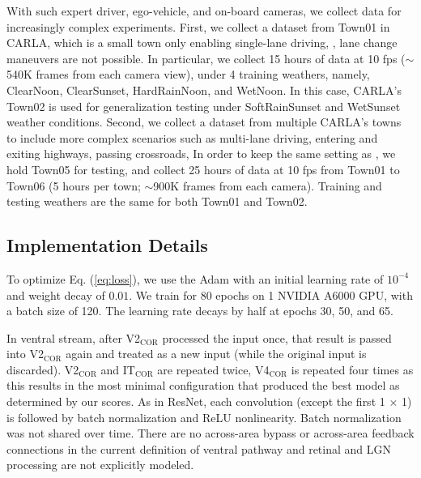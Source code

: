 With such expert driver, ego-vehicle, and on-board cameras, we collect data for increasingly complex experiments. 
First, we collect a dataset from Town01 in CARLA, which is a small town only enabling single-lane driving, {\ie}, lane change maneuvers are not possible. 
In particular, we collect 15 hours of data at 10 fps ($\sim$540K frames from each camera view), under 4 training weathers, namely, ClearNoon, ClearSunset, HardRainNoon, and WetNoon. 
In this case, CARLA's Town02 is used for generalization testing under SoftRainSunset and WetSunset weather conditions. 
Second, we collect a dataset from multiple CARLA's towns to include more complex scenarios such as multi-lane driving, entering and exiting highways, passing crossroads, {\etc} In order to keep the same setting as \cite{Hu:2022}, we hold Town05 for testing, and collect 25 hours of data at 10 fps from Town01 to Town06 (5 hours per town; $\sim$900K frames from each camera). 
Training and testing weathers are the same for both Town01 and Town02. 



\subsection{Implementation Details}
\hspace{1pc}To optimize Eq. (\ref{eq:loss}), we use the Adam \cite{Kingma:2015} with an initial learning rate of $10^{-4}$ and weight decay of $0.01$. 
We train for 80 epochs on 1 NVIDIA A6000 GPU, with a batch size of 120. 
The learning rate decays by half at epochs 30, 50, and 65. 

In ventral stream, after V2$_\text{COR}$ processed the input once, that result is passed into V2$_\text{COR}$ again and treated as a new input (while the original input is discarded). 
V2$_\text{COR}$ and IT$_\text{COR}$ are repeated twice, V4$_\text{COR}$ is repeated four times as this results in the most minimal configuration that produced the best model as determined by our scores. 
As in ResNet, each convolution (except the first 1 $ \times $ 1) is followed by batch normalization and ReLU nonlinearity. 
Batch normalization was not shared over time. 
There are no across-area bypass or across-area feedback connections in the current definition of ventral pathway and retinal and LGN processing are not explicitly modeled.



